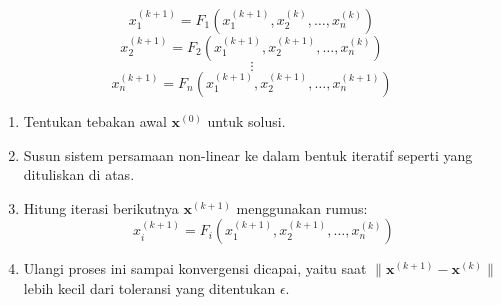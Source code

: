 \documentclass[a4paper,extrafontsizes, 9pt]{memoir}
\begin{document}
\begin{multicols}{3}
\[
x_1^{(k+1)} = F_1(x_1^{(k+1)}, x_2^{(k)}, \dots, x_n^{(k)})
\]
\[
x_2^{(k+1)} = F_2(x_1^{(k+1)}, x_2^{(k+1)}, \dots, x_n^{(k)})
\]
\[
\vdots
\]
\[
x_n^{(k+1)} = F_n(x_1^{(k+1)}, x_2^{(k+1)}, \dots, x_n^{(k+1)})
\]
\begin{enumerate}
    \item Tentukan tebakan awal \( \mathbf{x}^{(0)} \) untuk solusi.
    \item Susun sistem persamaan non-linear ke dalam bentuk iteratif seperti yang dituliskan di atas.
    \item Hitung iterasi berikutnya \( \mathbf{x}^{(k+1)} \) menggunakan rumus:
    \[
    x_i^{(k+1)} = F_i(x_1^{(k+1)}, x_2^{(k+1)}, \dots, x_n^{(k)})
    \]
    \item Ulangi proses ini sampai konvergensi dicapai, yaitu saat \( \|\mathbf{x}^{(k+1)} - \mathbf{x}^{(k)}\| \) lebih kecil dari toleransi yang ditentukan \( \epsilon \).
\end{enumerate}
    \end{multicols}
\end{document}

